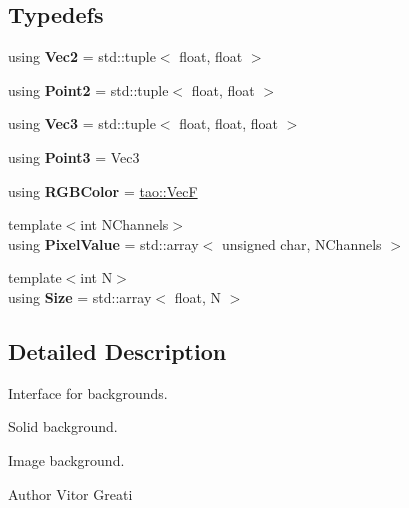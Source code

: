 \subsection*{Typedefs}
\begin{DoxyCompactItemize}
\item 
\mbox{\label{namespaceomg_af31bce5e0c003ffa803dffd7540cdec5}} 
using {\bfseries Vec2} = std\+::tuple$<$ float, float $>$
\item 
\mbox{\label{namespaceomg_a115f08615ca70091ccd64afc8793b7c0}} 
using {\bfseries Point2} = std\+::tuple$<$ float, float $>$
\item 
\mbox{\label{namespaceomg_ad3d75c19a8d2e77af4db82dcc3c70659}} 
using {\bfseries Vec3} = std\+::tuple$<$ float, float, float $>$
\item 
\mbox{\label{namespaceomg_af85242d35fdacf829d32a6f9b95f3e35}} 
using {\bfseries Point3} = Vec3
\item 
\mbox{\label{namespaceomg_a92d9bbc48ad35def2aa4b0ac3a5b22ae}} 
using {\bfseries R\+G\+B\+Color} = \mbox{\hyperlink{namespacetao_acdec2e843192294a6f3d4ab911c6cbae}{tao\+::\+VecF}}
\item 
\mbox{\label{namespaceomg_adfd06c82d92702d5d6411fb77c25af04}} 
{\footnotesize template$<$int N\+Channels$>$ }\\using {\bfseries Pixel\+Value} = std\+::array$<$ unsigned char, N\+Channels $>$
\item 
\mbox{\label{namespaceomg_a3f437d3821402dd1b1d1ddb5c73f6597}} 
{\footnotesize template$<$int N$>$ }\\using {\bfseries Size} = std\+::array$<$ float, N $>$
\end{DoxyCompactItemize}


\subsection{Detailed Description}
Interface for backgrounds. 

Solid background.

Image background.

\begin{DoxyAuthor}{Author}
Vitor Greati 
\end{DoxyAuthor}
